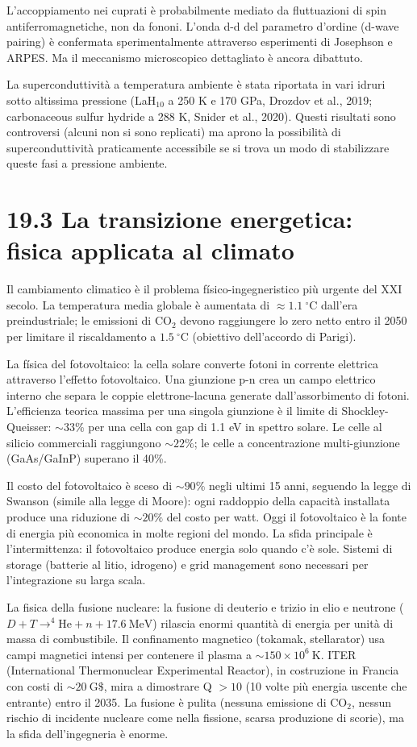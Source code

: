 \documentclass[11.5pt,a4paper,openany]{book}
\theoremstyle{remark}
\begin{document}
L'accoppiamento nei cuprati è probabilmente mediato da fluttuazioni di spin antiferromagnetiche, non da fononi. L'onda d-d del parametro d'ordine (d-wave pairing) è confermata sperimentalmente attraverso esperimenti di Josephson e ARPES. Ma il meccanismo microscopico dettagliato è ancora dibattuto.

La superconduttività a temperatura ambiente è stata riportata in vari idruri sotto altissima pressione (LaH$_{10}$ a 250 K e 170 GPa, Drozdov et al., 2019; carbonaceous sulfur hydride a 288 K, Snider et al., 2020). Questi risultati sono controversi (alcuni non si sono replicati) ma aprono la possibilità di superconduttività praticamente accessibile se si trova un modo di stabilizzare queste fasi a pressione ambiente.

\section{19.3 La transizione energetica: fisica applicata al climato}

Il cambiamento climatico è il problema físico-ingegneristico più urgente del XXI secolo. La temperatura media globale è aumentata di $\approx 1.1\ ^\circ\text{C}$ dall'era preindustriale; le emissioni di CO$_2$ devono raggiungere lo zero netto entro il 2050 per limitare il riscaldamento a $1.5\ ^\circ\text{C}$ (obiettivo dell'accordo di Parigi).

La física del fotovoltaico: la cella solare converte fotoni in corrente elettrica attraverso l'effetto fotovoltaico. Una giunzione p-n crea un campo elettrico interno che separa le coppie elettrone-lacuna generate dall'assorbimento di fotoni. L'efficienza teorica massima per una singola giunzione è il limite di Shockley-Queisser: $\sim 33\%$ per una cella con gap di 1.1 eV in spettro solare. Le celle al silicio commerciali raggiungono $\sim 22\%$; le celle a concentrazione multi-giunzione (GaAs/GaInP) superano il 40\%.

Il costo del fotovoltaico è sceso di $\sim 90\%$ negli ultimi 15 anni, seguendo la legge di Swanson (simile alla legge di Moore): ogni raddoppio della capacità installata produce una riduzione di $\sim 20\%$ del costo per watt. Oggi il fotovoltaico è la fonte di energia più economica in molte regioni del mondo. La sfida principale è l'intermittenza: il fotovoltaico produce energia solo quando c'è sole. Sistemi di storage (batterie al litio, idrogeno) e grid management sono necessari per l'integrazione su larga scala.

La fisica della fusione nucleare: la fusione di deuterio e trizio in elio e neutrone ($D + T \to ^4\text{He} + n + 17.6\ \text{MeV}$) rilascia enormi quantità di energia per unità di massa di combustibile. Il confinamento magnetico (tokamak, stellarator) usa campi magnetici intensi per contenere il plasma a $\sim 150 \times 10^6\ \text{K}$. ITER (International Thermonuclear Experimental Reactor), in costruzione in Francia con costi di $\sim 20\ \text{G\$}$, mira a dimostrare Q $> 10$ (10 volte più energia uscente che entrante) entro il 2035. La fusione è pulita (nessuna emissione di CO$_2$, nessun rischio di incidente nucleare come nella fissione, scarsa produzione di scorie), ma la sfida dell'ingegneria è enorme.
\end{document}
